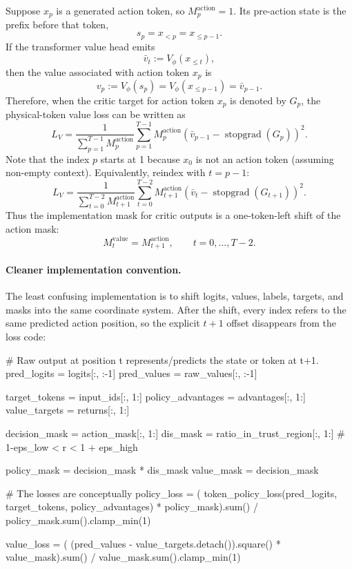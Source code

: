 Suppose $x_p$ is a generated action token, so $M_p^{\text{action}}=1$. Its pre-action state is the prefix before that token,
\[
    s_p=x_{<p}=x_{\le p-1}.
\]
If the transformer value head emits
\[
    \bar v_t:=V_\phi(x_{\le t}),
\]
then the value associated with action token $x_p$ is
\[
    v_p:=V_\phi(s_p)=V_\phi(x_{\le p-1})=\bar v_{p-1}.
\]
Therefore, when the critic target for action token $x_p$ is denoted by $G_p$, the physical-token value loss can be written as
\[
    L_V
    =
    \frac{1}{\sum_{p=1}^{T-1}M_p^{\text{action}}}
    \sum_{p=1}^{T-1}M_p^{\text{action}}
    \left(\bar v_{p-1}-\operatorname{stopgrad}(G_p)\right)^2.
\]
Note that the index $p$ starts at 1 because $x_0$ is not an action token (assuming non-empty context).
Equivalently, reindex with $t=p-1$:
\[
    L_V
    =
    \frac{1}{\sum_{t=0}^{T-2}M_{t+1}^{\text{action}}}
    \sum_{t=0}^{T-2}M_{t+1}^{\text{action}}
    \left(\bar v_t-\operatorname{stopgrad}(G_{t+1})\right)^2.
\]
Thus the implementation mask for critic outputs is a one-token-left shift of the action mask:
\[
    M_t^{\text{value}}=M_{t+1}^{\text{action}},
    \qquad t=0,\ldots,T-2.
\]
\paragraph{Cleaner implementation convention.}
The least confusing implementation is to shift logits, values, labels, targets, and masks into the same coordinate system. After the shift, every index refers to the same predicted action position, so the explicit $t+1$ offset disappears from the loss code:
\begin{codeblock}[language=Python]
# Raw output at position t represents/predicts the state or token at t+1.
pred_logits = logits[:, :-1]
pred_values = raw_values[:, :-1]

target_tokens = input_ids[:, 1:]
policy_advantages = advantages[:, 1:]
value_targets = returns[:, 1:]

decision_mask = action_mask[:, 1:]
dis_mask = ratio_in_trust_region[:, 1:] # 1-eps_low < r < 1 + eps_high

policy_mask = decision_mask * dis_mask
value_mask = decision_mask

# The losses are conceptually
policy_loss = (
    token_policy_loss(pred_logits, target_tokens, policy_advantages)
    * policy_mask).sum() / policy_mask.sum().clamp_min(1)

value_loss = (
    (pred_values - value_targets.detach()).square()
    * value_mask).sum() / value_mask.sum().clamp_min(1)
\end{codeblock}